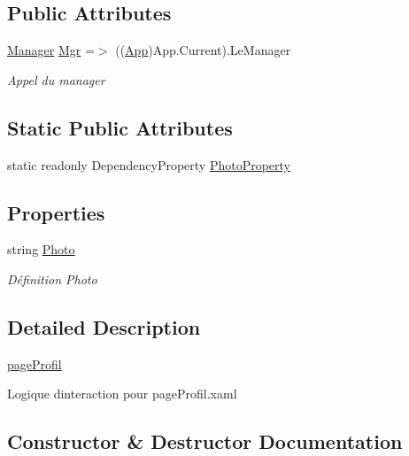 \subsection*{Public Attributes}
\begin{DoxyCompactItemize}
\item 
\hyperlink{classModele_1_1Manager}{Manager} \hyperlink{classnewPizza1_1_1pageProfil_af21fd7e24c11b3a1c5ed9f0ca1af2368}{Mgr} =$>$ ((\hyperlink{classnewPizza1_1_1App}{App})App.\+Current).Le\+Manager
\begin{DoxyCompactList}\small\item\em Appel du manager \end{DoxyCompactList}\end{DoxyCompactItemize}
\subsection*{Static Public Attributes}
\begin{DoxyCompactItemize}
\item 
static readonly Dependency\+Property \hyperlink{classnewPizza1_1_1pageProfil_a525d9044b16024773ab65eb855057c93}{Photo\+Property}
\end{DoxyCompactItemize}
\subsection*{Properties}
\begin{DoxyCompactItemize}
\item 
string \hyperlink{classnewPizza1_1_1pageProfil_ae10574387cb288277c15a1e317e0747c}{Photo}
\begin{DoxyCompactList}\small\item\em Définition Photo \end{DoxyCompactList}\end{DoxyCompactItemize}


\subsection{Detailed Description}
\hyperlink{classnewPizza1_1_1pageProfil}{page\+Profil} 

Logique d\textquotesingle{}interaction pour page\+Profil.\+xaml 

\subsection{Constructor \& Destructor Documentation}
\mbox{\label{classnewPizza1_1_1pageProfil_a07e57420aca7af196086a365421e0d3c}} 
